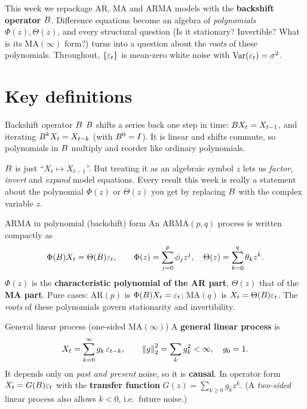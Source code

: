 \documentclass[11pt]{article}
\begin{document}

This week we repackage AR, MA and ARMA models with the \textbf{backshift operator} $B$. Difference equations become an algebra of \emph{polynomials} $\Phi(z),\Theta(z)$, and every structural question (Is it stationary? Invertible? What is its $\mathrm{MA}(\infty)$ form?) turns into a question about the \emph{roots} of these polynomials. Throughout, $\{\varepsilon_t\}$ is mean-zero white noise with $\operatorname{Var}(\varepsilon_t)=\sigma^2$.

\section*{Key definitions}

\begin{defn}{Backshift operator $B$}
$B$ shifts a series back one step in time: $B X_t = X_{t-1}$, and iterating $B^k X_t = X_{t-k}$ (with $B^0=I$). It is linear and shifts commute, so polynomials in $B$ multiply and reorder like ordinary polynomials.
\end{defn}

\begin{intu}
$B$ is just ``$X_t\mapsto X_{t-1}$''. But treating it as an algebraic symbol $z$ lets us \emph{factor}, \emph{invert} and \emph{expand} model equations. Every result this week is really a statement about the polynomial $\Phi(z)$ or $\Theta(z)$ you get by replacing $B$ with the complex variable $z$.
\end{intu}

\begin{defn}{ARMA in polynomial (backshift) form}
An $\mathrm{ARMA}(p,q)$ process is written compactly as
\[
\Phi(B)X_t=\Theta(B)\varepsilon_t,\qquad
\Phi(z)=\sum_{j=0}^{p}\phi_j z^{j},\quad
\Theta(z)=\sum_{k=0}^{q}\theta_k z^{k}.
\]
$\Phi(z)$ is the \textbf{characteristic polynomial of the AR part}, $\Theta(z)$ that of the \textbf{MA part}. Pure cases: $\mathrm{AR}(p)$ is $\Phi(B)X_t=\varepsilon_t$; $\mathrm{MA}(q)$ is $X_t=\Theta(B)\varepsilon_t$. The \emph{roots} of these polynomials govern stationarity and invertibility.
\end{defn}

\begin{defn}{General linear process (one-sided $\mathrm{MA}(\infty)$)}
A \textbf{general linear process} is
\[
X_t=\sum_{k=0}^{\infty}g_k\,\varepsilon_{t-k},\qquad \left\lVert g \right\rVert_2^2=\sum_k g_k^2<\infty,\quad g_0=1.
\]
It depends only on \emph{past and present} noise, so it is \textbf{causal}. In operator form $X_t=G(B)\varepsilon_t$ with the \textbf{transfer function} $G(z)=\sum_{k\ge0}g_k z^k$. (A \emph{two-sided} linear process also allows $k<0$, i.e.\ future noise.)
\end{defn}
\end{document}
